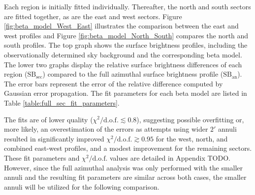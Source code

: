 Each region is initially fitted individually. Thereafter, the north and south sectors are fitted together, as are the east and west sectors. Figure \ref{fig:beta_model_West_East} illustrates the comparison between the east and west profiles and Figure \ref{fig:beta_model_North_South} compares the north and south profiles. The top graph shows the surface brightness profiles, including the observationally determined sky background and the corresponding beta model. The lower two graphs display the relative surface brightness differences of each region (\(\text{SB}_\text{sec}\)) compared to the full azimuthal surface brightness profile (\(\text{SB}_\text{an}\)). The error bars represent the error of the relative difference computed by Gaussian error propagation. The fit parameters for each beta model are listed in Table \ref{table:full_sec_fit_parameters}. 

The fits are of lower quality ($\chi^2 / \text{d.o.f.} \lesssim 0.8$), suggesting possible overfitting or, more likely, an overestimation of the errors as attempts using wider $2'$ annuli resulted in significantly improved $\chi^2 / \text{d.o.f.} \gtrsim 0.95$ for the west, north, and combined east-west profiles, and a modest improvement for the remaining sectors. These fit parameters and $\chi^2 / \text{d.o.f.}$ values are detailed in Appendix TODO. However, since the full azimuthal analysis was only performed with the smaller annuli and the resulting fit parameters are similar across both cases, the smaller annuli will be utilized for the following comparison. 

